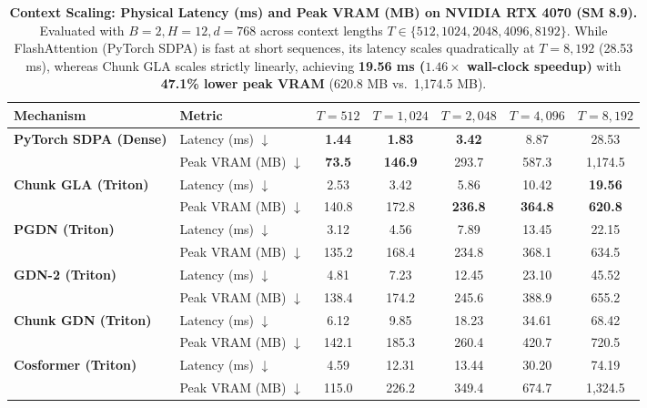 \begin{table}[t]
\centering
\caption{\textbf{Context Scaling: Physical Latency (ms) and Peak VRAM (MB) on NVIDIA RTX 4070 (SM 8.9).}
Evaluated with $B=2, H=12, d=768$ across context lengths $T \in \{512, 1024, 2048, 4096, 8192\}$.
While FlashAttention (PyTorch SDPA) is fast at short sequences, its latency scales quadratically at $T=8,192$ (28.53 ms), whereas Chunk GLA scales strictly linearly, achieving \textbf{19.56 ms ($1.46\times$ wall-clock speedup)} with \textbf{47.1\% lower peak VRAM} (620.8 MB vs.\ 1,174.5 MB).}
\label{tab:long_context}
\scriptsize
\setlength{\tabcolsep}{3.5pt}
\begin{tabular}{llccccc}
\toprule
\textbf{Mechanism} & \textbf{Metric} & \textbf{$T = 512$} & \textbf{$T = 1,024$} & \textbf{$T = 2,048$} & \textbf{$T = 4,096$} & \textbf{$T = 8,192$} \\
\midrule
\multirow{2}{*}{\textbf{PyTorch SDPA (Dense)}} & Latency (ms) $\downarrow$ & \textbf{1.44} & \textbf{1.83} & \textbf{3.42} & 8.87 & 28.53 \\
 & Peak VRAM (MB) $\downarrow$ & \textbf{73.5} & \textbf{146.9} & 293.7 & 587.3 & 1,174.5 \\
\midrule
\multirow{2}{*}{\textbf{Chunk GLA (Triton)}} & Latency (ms) $\downarrow$ & 2.53 & 3.42 & 5.86 & 10.42 & \textbf{19.56} \\
 & Peak VRAM (MB) $\downarrow$ & 140.8 & 172.8 & \textbf{236.8} & \textbf{364.8} & \textbf{620.8} \\
\midrule
\multirow{2}{*}{\textbf{PGDN (Triton)}} & Latency (ms) $\downarrow$ & 3.12 & 4.56 & 7.89 & 13.45 & 22.15 \\
 & Peak VRAM (MB) $\downarrow$ & 135.2 & 168.4 & 234.8 & 368.1 & 634.5 \\
\midrule
\multirow{2}{*}{\textbf{GDN-2 (Triton)}} & Latency (ms) $\downarrow$ & 4.81 & 7.23 & 12.45 & 23.10 & 45.52 \\
 & Peak VRAM (MB) $\downarrow$ & 138.4 & 174.2 & 245.6 & 388.9 & 655.2 \\
\midrule
\multirow{2}{*}{\textbf{Chunk GDN (Triton)}} & Latency (ms) $\downarrow$ & 6.12 & 9.85 & 18.23 & 34.61 & 68.42 \\
 & Peak VRAM (MB) $\downarrow$ & 142.1 & 185.3 & 260.4 & 420.7 & 720.5 \\
\midrule
\multirow{2}{*}{\textbf{Cosformer (Triton)}} & Latency (ms) $\downarrow$ & 4.59 & 12.31 & 13.44 & 30.20 & 74.19 \\
 & Peak VRAM (MB) $\downarrow$ & 115.0 & 226.2 & 349.4 & 674.7 & 1,324.5 \\
\bottomrule
\end{tabular}
\end{table}
